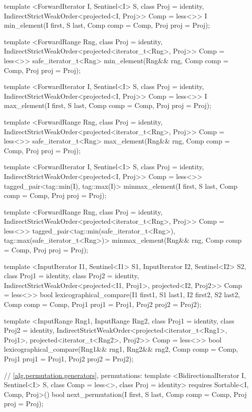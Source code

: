 \begin{codeblock}
{{{{  template <ForwardIterator I, Sentinel<I> S, class Proj = identity,
      IndirectStrictWeakOrder<projected<I, Proj>> Comp = less<>>
    I min_element(I first, S last, Comp comp = Comp{}, Proj proj = Proj{});

  template <ForwardRange Rng, class Proj = identity,
      IndirectStrictWeakOrder<projected<iterator_t<Rng>, Proj>> Comp = less<>>
    safe_iterator_t<Rng>
      min_element(Rng&& rng, Comp comp = Comp{}, Proj proj = Proj{});

  template <ForwardIterator I, Sentinel<I> S, class Proj = identity,
      IndirectStrictWeakOrder<projected<I, Proj>> Comp = less<>>
    I max_element(I first, S last, Comp comp = Comp{}, Proj proj = Proj{});

  template <ForwardRange Rng, class Proj = identity,
      IndirectStrictWeakOrder<projected<iterator_t<Rng>, Proj>> Comp = less<>>
    safe_iterator_t<Rng>
      max_element(Rng&& rng, Comp comp = Comp{}, Proj proj = Proj{});

  template <ForwardIterator I, Sentinel<I> S, class Proj = identity,
      IndirectStrictWeakOrder<projected<I, Proj>> Comp = less<>>
    tagged_pair<tag::min(I), tag::max(I)>
      minmax_element(I first, S last, Comp comp = Comp{}, Proj proj = Proj{});

  template <ForwardRange Rng, class Proj = identity,
      IndirectStrictWeakOrder<projected<iterator_t<Rng>, Proj>> Comp = less<>>
    tagged_pair<tag::min(safe_iterator_t<Rng>),
                tag::max(safe_iterator_t<Rng>)>
      minmax_element(Rng&& rng, Comp comp = Comp{}, Proj proj = Proj{});

  template <InputIterator I1, Sentinel<I1> S1, InputIterator I2, Sentinel<I2> S2,
      class Proj1 = identity, class Proj2 = identity,
      IndirectStrictWeakOrder<projected<I1, Proj1>, projected<I2, Proj2>> Comp = less<>>
    bool
      lexicographical_compare(I1 first1, S1 last1, I2 first2, S2 last2,
                              Comp comp = Comp{}, Proj1 proj1 = Proj1{}, Proj2 proj2 = Proj2{});

  template <InputRange Rng1, InputRange Rng2, class Proj1 = identity,
      class Proj2 = identity,
      IndirectStrictWeakOrder<projected<iterator_t<Rng1>, Proj1>,
        projected<iterator_t<Rng2>, Proj2>> Comp = less<>>
    bool
      lexicographical_compare(Rng1&& rng1, Rng2&& rng2, Comp comp = Comp{},
                              Proj1 proj1 = Proj1{}, Proj2 proj2 = Proj2{});

  // \ref{alg.permutation.generators}, permutations:
  template <BidirectionalIterator I, Sentinel<I> S, class Comp = less<>,
      class Proj = identity>
    requires Sortable<I, Comp, Proj>()
    bool next_permutation(I first, S last, Comp comp = Comp{}, Proj proj = Proj{});

}}}}
\end{codeblock}
